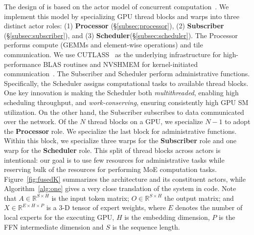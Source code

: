 The design of \sysname is based on the actor model of concurrent computation~\cite{agha:85, 10.5555/1624775.1624804, Greif:75}. We implement this model by specializing GPU thread blocks and warps into three distinct actor roles: (1) \textbf{Processor} (\S\ref{subsec:processor}), (2) \textbf{Subscriber} (\S\ref{subsec:subscriber}), and (3) \textbf{Scheduler}(\S\ref{subsec:scheduler}).
The Processor performs compute (GEMMs and element-wise operations) and tile communication. We use CUTLASS~\cite{Thakkar_CUTLASS_2023} as the underlying infrastructure for high-performance BLAS routines and NVSHMEM for kernel-initiated communication~\cite{nvshm}. The Subscriber and Scheduler perform administrative functions. Specifically, the Scheduler assigns computational tasks to available thread blocks. One key innovation is making the Scheduler both \emph{multithreaded}, enabling high scheduling throughput, and \emph{work-conserving}, ensuring consistently high GPU SM utilization. On the other hand, the Subscriber subscribes to data communicated over the network. Of the $N$ thread blocks on a GPU, we specialize $N-1$ to adopt the \textbf{Processor} role. We specialize the last block for administrative functions. Within this block, we specialize three warps for the \textbf{Subscriber} role and one warp for the \textbf{Scheduler} role. This split of thread blocks across actors is intentional: our goal is to use few resources for administrative tasks while reserving bulk of the resources for performing MoE computation tasks. Figure~\ref{fig:fusedK} summarizes the \sysname architecture and its constituent actors, while Algorithm~\ref{alg:one} gives a very close translation of the
system in code. Note that $A \in \mathbb{R}^{S \times H}$ is the input token matrix;
$O \in \mathbb{R}^{S \times H}$ the output matrix;
and $X \in \mathbb{R}^{E\times H \times P}$ is a 3-D tensor of expert weights,
where $E$ denotes the number of local experts for the executing GPU, $H$ is the embedding dimension,
$P$ is the FFN intermediate dimension and $S$ is the sequence length.

